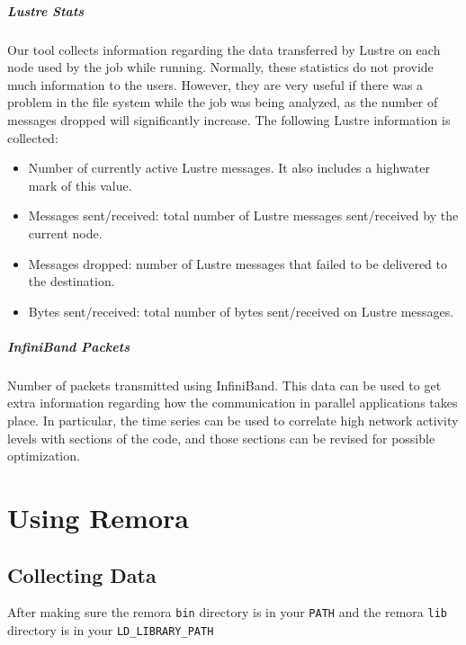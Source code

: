 \documentclass[10pt,a4paper]{report}
\begin{document}
\paragraph{Lustre Stats}
Our tool collects information regarding the data transferred by Lustre on each node used by the job while running. Normally, these statistics do not provide much information to the users. However, they are very useful if there was a problem in the file system while the job was being analyzed, as the number of messages dropped will significantly increase. The following Lustre information is collected:

\begin{itemize}
\item Number of currently active Lustre messages. It also includes a highwater mark of this value.
\item Messages sent/received: total number of Lustre messages sent/received by the current node.
\item Messages dropped: number of Lustre messages that failed to be delivered to the destination.
\item Bytes sent/received: total number of bytes sent/received on Lustre messages.
\end{itemize}


\paragraph{InfiniBand Packets}
Number of packets transmitted using InfiniBand. This data can be used to get extra information regarding how the communication in parallel applications takes place. In particular, the time series can be used to correlate high network activity levels with sections of the code, and those sections can be revised for possible optimization.

\FloatBarrier
\chapter{Using Remora}

\section{Collecting Data}
After making sure the remora \verb+bin+ directory is in your \verb+PATH+ and the remora \verb+lib+ directory is in your \verb|LD_LIBRARY_PATH|
\end{document}
